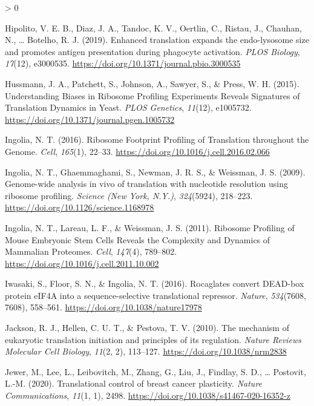 \documentclass[
  12pt,
  openany]{book}
\newlength{\cslhangindent}
\newenvironment{CSLReferences}[2] %
 {%
  \setlength{\parindent}{0pt}
  \ifodd #1 \everypar{\setlength{\hangindent}{\cslhangindent}}\ignorespaces\fi
  \ifnum #2 > 0
  \setlength{\parskip}{#2\baselineskip}
  \fi
 }%
 {}
\begin{document}
\begin{CSLReferences}{1}{0}
\leavevmode\hypertarget{ref-Hipolito2019}{}%
Hipolito, V. E. B., Diaz, J. A., Tandoc, K. V., Oertlin, C., Ristau, J., Chauhan, N., \ldots{} Botelho, R. J. (2019). Enhanced translation expands the endo-lysosome size and promotes antigen presentation during phagocyte activation. \emph{PLOS Biology}, \emph{17}(12), e3000535. \url{https://doi.org/10.1371/journal.pbio.3000535}

\leavevmode\hypertarget{ref-Hussmann2015}{}%
Hussmann, J. A., Patchett, S., Johnson, A., Sawyer, S., \& Press, W. H. (2015). Understanding {Biases} in {Ribosome Profiling Experiments Reveals Signatures} of {Translation Dynamics} in {Yeast}. \emph{PLOS Genetics}, \emph{11}(12), e1005732. \url{https://doi.org/10.1371/journal.pgen.1005732}

\leavevmode\hypertarget{ref-Ingolia2016}{}%
Ingolia, N. T. (2016). Ribosome {Footprint Profiling} of {Translation} throughout the {Genome}. \emph{Cell}, \emph{165}(1), 22--33. \url{https://doi.org/10.1016/j.cell.2016.02.066}

\leavevmode\hypertarget{ref-Ingolia2009}{}%
Ingolia, N. T., Ghaemmaghami, S., Newman, J. R. S., \& Weissman, J. S. (2009). Genome-wide analysis in vivo of translation with nucleotide resolution using ribosome profiling. \emph{Science (New York, N.Y.)}, \emph{324}(5924), 218--223. \url{https://doi.org/10.1126/science.1168978}

\leavevmode\hypertarget{ref-Ingolia2011}{}%
Ingolia, N. T., Lareau, L. F., \& Weissman, J. S. (2011). Ribosome {Profiling} of {Mouse Embryonic Stem Cells Reveals} the {Complexity} and {Dynamics} of {Mammalian Proteomes}. \emph{Cell}, \emph{147}(4), 789--802. \url{https://doi.org/10.1016/j.cell.2011.10.002}

\leavevmode\hypertarget{ref-Iwasaki2016}{}%
Iwasaki, S., Floor, S. N., \& Ingolia, N. T. (2016). Rocaglates convert {DEAD}-box protein {eIF4A} into a sequence-selective translational repressor. \emph{Nature}, \emph{534}(7608, 7608), 558--561. \url{https://doi.org/10.1038/nature17978}

\leavevmode\hypertarget{ref-Jackson2010}{}%
Jackson, R. J., Hellen, C. U. T., \& Pestova, T. V. (2010). The mechanism of eukaryotic translation initiation and principles of its regulation. \emph{Nature Reviews Molecular Cell Biology}, \emph{11}(2, 2), 113--127. \url{https://doi.org/10.1038/nrm2838}

\leavevmode\hypertarget{ref-Jewer2020}{}%
Jewer, M., Lee, L., Leibovitch, M., Zhang, G., Liu, J., Findlay, S. D., \ldots{} Postovit, L.-M. (2020). Translational control of breast cancer plasticity. \emph{Nature Communications}, \emph{11}(1, 1), 2498. \url{https://doi.org/10.1038/s41467-020-16352-z}


\end{CSLReferences}
\end{document}
